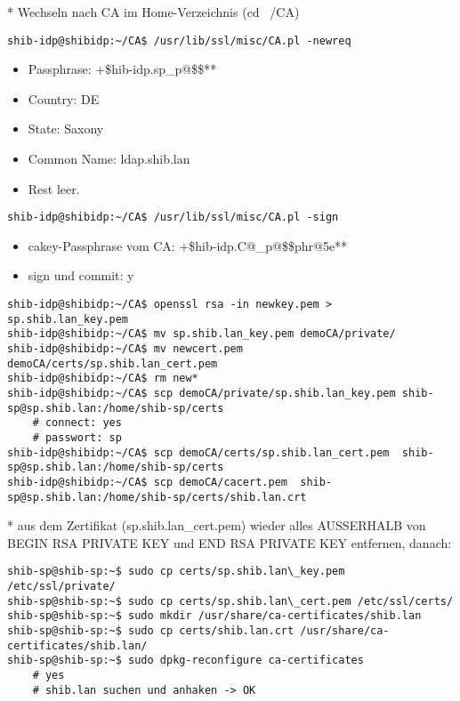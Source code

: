 * Wechseln nach CA im Home-Verzeichnis (cd ~/CA)
\begin{lstlisting}
shib-idp@shibidp:~/CA$ /usr/lib/ssl/misc/CA.pl -newreq
\end{lstlisting}
\begin{itemize}
\item Passphrase: +\$hib-idp.sp\_p@\$\$**
\item Country: DE
\item State: Saxony
\item Common Name: ldap.shib.lan
\item Rest leer.
\end{itemize}
\begin{lstlisting}
shib-idp@shibidp:~/CA$ /usr/lib/ssl/misc/CA.pl -sign
\end{lstlisting}
\begin{itemize}
\item cakey-Passphrase vom CA: +\$hib-idp.C@\_p@\$\$phr@5e**
\item sign und commit: y
\end{itemize}
\begin{lstlisting}
shib-idp@shibidp:~/CA$ openssl rsa -in newkey.pem > sp.shib.lan_key.pem
shib-idp@shibidp:~/CA$ mv sp.shib.lan_key.pem demoCA/private/
shib-idp@shibidp:~/CA$ mv newcert.pem demoCA/certs/sp.shib.lan_cert.pem
shib-idp@shibidp:~/CA$ rm new*
shib-idp@shibidp:~/CA$ scp demoCA/private/sp.shib.lan_key.pem shib-sp@sp.shib.lan:/home/shib-sp/certs
	# connect: yes
	# passwort: sp
shib-idp@shibidp:~/CA$ scp demoCA/certs/sp.shib.lan_cert.pem  shib-sp@sp.shib.lan:/home/shib-sp/certs
shib-idp@shibidp:~/CA$ scp demoCA/cacert.pem  shib-sp@sp.shib.lan:/home/shib-sp/certs/shib.lan.crt
\end{lstlisting}

* aus dem Zertifikat (sp.shib.lan\_cert.pem) wieder alles AUSSERHALB von BEGIN
RSA PRIVATE KEY und END RSA PRIVATE KEY entfernen, danach:
\begin{lstlisting}
shib-sp@shib-sp:~$ sudo cp certs/sp.shib.lan\_key.pem /etc/ssl/private/
shib-sp@shib-sp:~$ sudo cp certs/sp.shib.lan\_cert.pem /etc/ssl/certs/
shib-sp@shib-sp:~$ sudo mkdir /usr/share/ca-certificates/shib.lan
shib-sp@shib-sp:~$ sudo cp certs/shib.lan.crt /usr/share/ca-certificates/shib.lan/
shib-sp@shib-sp:~$ sudo dpkg-reconfigure ca-certificates
	# yes
	# shib.lan suchen und anhaken -> OK
\end{lstlisting}

